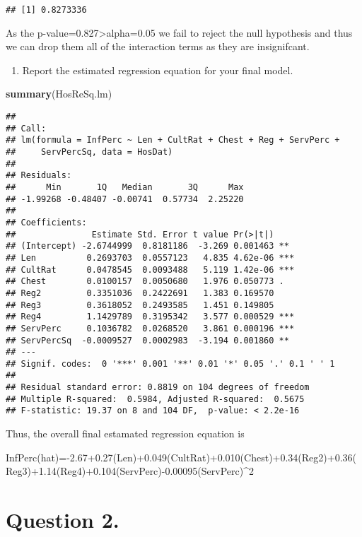 \documentclass[]{article}
\newenvironment{Shaded}{\begin{snugshade}}{\end{snugshade}}
\newcommand{\KeywordTok}[1]{\textcolor[rgb]{0.13,0.29,0.53}{\textbf{#1}}}
\newcommand{\NormalTok}[1]{#1}
\providecommand{\tightlist}{%
  \setlength{\itemsep}{0pt}\setlength{\parskip}{0pt}}
\begin{document}
\begin{verbatim}
## [1] 0.8273336
\end{verbatim}

As the p-value=0.827\textgreater{}alpha=0.05 we fail to reject the null
hypothesis and thus we can drop them all of the interaction terms as
they are insignifcant.

\begin{enumerate}
\def\labelenumi{\Alph{enumi})}
\setcounter{enumi}{7}
\tightlist
\item
  Report the estimated regression equation for your final model.
\end{enumerate}

\begin{Shaded}
\begin{Highlighting}[]
\KeywordTok{summary}\NormalTok{(HosReSq.lm)}
\end{Highlighting}
\end{Shaded}

\begin{verbatim}
## 
## Call:
## lm(formula = InfPerc ~ Len + CultRat + Chest + Reg + ServPerc + 
##     ServPercSq, data = HosDat)
## 
## Residuals:
##      Min       1Q   Median       3Q      Max 
## -1.99268 -0.48407 -0.00741  0.57734  2.25220 
## 
## Coefficients:
##               Estimate Std. Error t value Pr(>|t|)    
## (Intercept) -2.6744999  0.8181186  -3.269 0.001463 ** 
## Len          0.2693703  0.0557123   4.835 4.62e-06 ***
## CultRat      0.0478545  0.0093488   5.119 1.42e-06 ***
## Chest        0.0100157  0.0050680   1.976 0.050773 .  
## Reg2         0.3351036  0.2422691   1.383 0.169570    
## Reg3         0.3618052  0.2493585   1.451 0.149805    
## Reg4         1.1429789  0.3195342   3.577 0.000529 ***
## ServPerc     0.1036782  0.0268520   3.861 0.000196 ***
## ServPercSq  -0.0009527  0.0002983  -3.194 0.001860 ** 
## ---
## Signif. codes:  0 '***' 0.001 '**' 0.01 '*' 0.05 '.' 0.1 ' ' 1
## 
## Residual standard error: 0.8819 on 104 degrees of freedom
## Multiple R-squared:  0.5984, Adjusted R-squared:  0.5675 
## F-statistic: 19.37 on 8 and 104 DF,  p-value: < 2.2e-16
\end{verbatim}

Thus, the overall final estamated regression equation is

InfPerc(hat)=-2.67+0.27(Len)+0.049(CultRat)+0.010(Chest)+0.34(Reg2)+0.36(Reg3)+1.14(Reg4)+0.104(ServPerc)-0.00095(ServPerc)\^{}2

\section{Question 2.}\label{question-2.}
\end{document}
